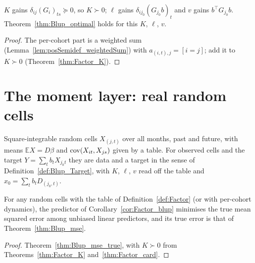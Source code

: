 \begin{theorem}\label{thm:Factor_card}
  \leanok
  $K$ gains $\delta_{ij}(G_i)_{ts} \succeq 0$, so $K \succ 0$; $\ell$ gains
  $\delta_{ij_0}(G_{j_0}b)_t$ and $v$ gains $b^\top G_{j_0}b$. Theorem~\ref{thm:Blup_optimal}
  holds for this $K$, $\ell$, $v$.
\end{theorem}
\begin{proof}
  \leanok
  The per-cohort part is a weighted sum (Lemma~\ref{lem:posSemidef_weightedSum}) with
  $a_{(i,t),j} = [i = j]$; add it to $K \succ 0$ (Theorem~\ref{thm:Factor_K}).
\end{proof}

\section*{The moment layer: real random cells}

\begin{definition}\label{def:Factor_Cells}
  \leanok
  Square-integrable random cells $X_{(j,t)}$ over all months, past and future, with means
  $\mathbb E X = D\beta$ and $\operatorname{cov}(X_{it}, X_{js})$ given by a table. For observed cells and
  the target $Y = \sum_t b_tX_{j_0t}$ they are data and a target in the sense of
  Definition~\ref{def:Blup_Target}, with $K$, $\ell$, $v$ read off the table and
  $x_0 = \sum_t b_tD_{(j_0,t)}$.
\end{definition}

\begin{theorem}\label{thm:Factor_mse_true}
  \leanok
  For any random cells with the table of Definition~\ref{def:Factor} (or with per-cohort
  dynamics), the predictor of Corollary~\ref{cor:Factor_blup} minimises the true mean squared
  error among unbiased linear predictors, and its true error is that of
  Theorem~\ref{thm:Blup_mse}.
\end{theorem}
\begin{proof}
  \leanok
  Theorem~\ref{thm:Blup_mse_true}, with $K \succ 0$ from Theorems~\ref{thm:Factor_K}
  and~\ref{thm:Factor_card}.
\end{proof}

